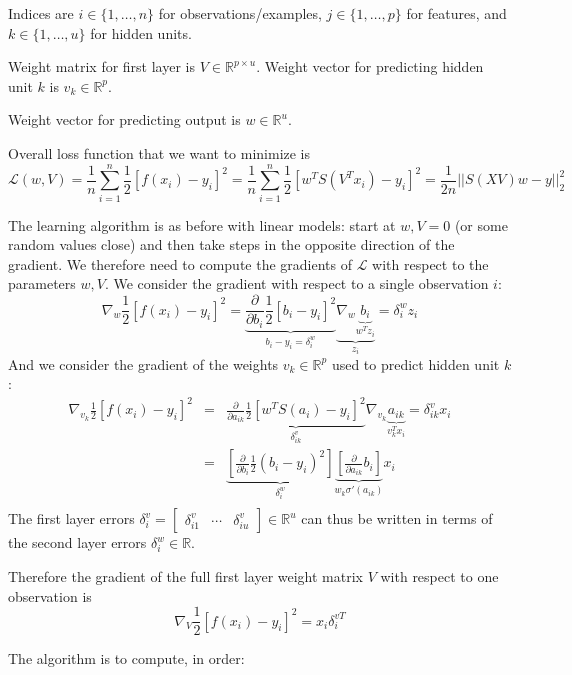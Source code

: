 \documentclass{article}
\begin{document}
Indices are $i\in\{1,\dots, n\}$ for observations/examples, $j\in\{1,\dots,p\}$ for features, and $k\in\{1,\dots, u\}$ for hidden units.

Weight matrix for first layer is $V\in\mathbb R^{p\times u}$. Weight vector for predicting hidden unit $k$ is $v_k\in\mathbb R^p$.

Weight vector for predicting output is $w\in\mathbb R^u$.

Overall loss function that we want to minimize is
$$
\mathcal L(w, V) = \frac 1 n \sum_{i=1}^n \frac 1 2 [ f(x_i) - y_i]^2 = \frac 1 n \sum_{i=1}^n \frac 1 2 [ w^T S(V^T x_i) - y_i]^2 = \frac{1}{2n} || S(XV) w - y||_2^2
$$

The learning algorithm is as before with linear models:
start at $w,V=0$ (or some random values close) and then take steps in the opposite direction of the gradient. 
We therefore need to compute the gradients of $\mathcal L$ with respect to the parameters $w,V$.
We consider the gradient with respect to a single observation $i$:
$$
\nabla_w \frac 1 2 [ f(x_i) - y_i ]^2 = 
\underbrace{
  \frac{\partial}{\partial b_i} \frac 1 2 [b_i -y_i]^2
}_{
  b_i - y_i = \delta^w_i
}
\underbrace{
  \nabla_w \underbrace{
    b_i
  }_{
    w^T z_i
  }
}_{
  z_i
}
= \delta^w_i z_i
$$
And we consider the gradient of the weights $v_k\in \mathbb R^p$ used to predict hidden unit $k$:
\begin{eqnarray*}
\nabla_{v_k} \frac 1 2 [ f(x_i) - y_i]^2 
&=& \underbrace{
  \frac{\partial}{\partial a_{ik}} \frac 1 2 [ w^T S(a_i) - y_i ]^2
}_{
  \delta^v_{ik}
} \nabla_{v_k} \underbrace{
  a_{ik}
}_{
  v_k^T x_i
} = \delta_{ik}^v x_i \\
&=& \underbrace{
  [ \frac{\partial}{\partial b_i} \frac 1 2 ( b_i - y_i )^2 ]
}_{
  \delta^w_i
}
\underbrace{
  [ \frac{\partial}{\partial a_{ik}} b_i ]
}_{
  w_k \sigma'(a_{ik})
}
x_i\\
\end{eqnarray*}
The first layer errors $\delta_i^v = \left[\begin{array}{ccc}
\delta_{i1}^v & \cdots & \delta_{iu}^v
\end{array}\right]\in\mathbb R^u$ can thus be written in terms of the second layer errors
$\delta_i^w\in\mathbb R$.

Therefore the gradient of the full first layer weight matrix $V$ with respect to one observation is
$$
\nabla_V \frac 1 2 [ f(x_i) - y_i ]^2 = x_i \delta_i^{vT}
$$

The algorithm is to compute, in order:
\end{document}
